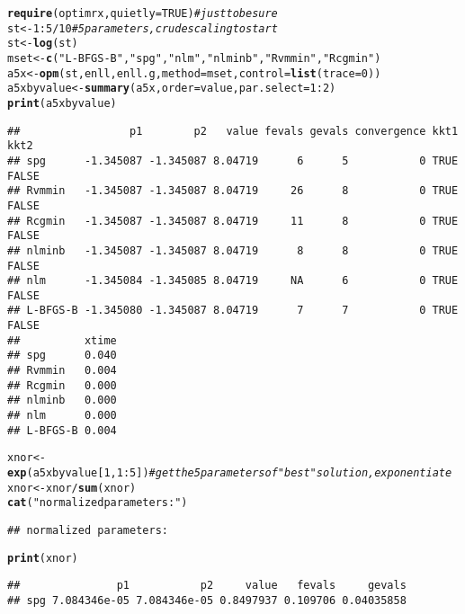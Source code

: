 \documentclass[11pt]{article}\usepackage[]{graphicx}\usepackage[]{color}
\makeatletter
\newcommand{\hlnum}[1]{\textcolor[rgb]{0.686,0.059,0.569}{#1}}%
\newcommand{\hlstr}[1]{\textcolor[rgb]{0.192,0.494,0.8}{#1}}%
\newcommand{\hlcom}[1]{\textcolor[rgb]{0.678,0.584,0.686}{\textit{#1}}}%
\newcommand{\hlopt}[1]{\textcolor[rgb]{0,0,0}{#1}}%
\newcommand{\hlstd}[1]{\textcolor[rgb]{0.345,0.345,0.345}{#1}}%
\newcommand{\hlkwb}[1]{\textcolor[rgb]{0.69,0.353,0.396}{#1}}%
\newcommand{\hlkwc}[1]{\textcolor[rgb]{0.333,0.667,0.333}{#1}}%
\newcommand{\hlkwd}[1]{\textcolor[rgb]{0.737,0.353,0.396}{\textbf{#1}}}%
\newenvironment{kframe}{%
 \def\at@end@of@kframe{}%
 \ifinner\ifhmode%
  \def\at@end@of@kframe{\end{minipage}}%
  \begin{minipage}{\columnwidth}%
 \fi\fi%
 \def\FrameCommand##1{\hskip\@totalleftmargin \hskip-\fboxsep
 \colorbox{shadecolor}{##1}\hskip-\fboxsep
     \hskip-\linewidth \hskip-\@totalleftmargin \hskip\columnwidth}%
 \MakeFramed {\advance\hsize-\width
   \@totalleftmargin\z@ \linewidth\hsize
   \@setminipage}}%
 {\par\unskip\endMakeFramed%
 \at@end@of@kframe}
\newenvironment{knitrout}{}{} %
\makeatother
\begin{document}
\begin{knitrout}\scriptsize
{}\color{fgcolor}\begin{kframe}
\begin{alltt}
\hlkwd{require}\hlstd{(optimrx,} \hlkwc{quietly}\hlstd{=}\hlnum{TRUE}\hlstd{)} \hlcom{# just to be sure}
\hlstd{st}\hlkwb{<-}\hlnum{1}\hlopt{:}\hlnum{5}\hlopt{/}\hlnum{10} \hlcom{# 5 parameters, crude scaling to start}
\hlstd{st}\hlkwb{<-}\hlkwd{log}\hlstd{(st)}
\hlstd{mset}\hlkwb{<-}\hlkwd{c}\hlstd{(}\hlstr{"L-BFGS-B"}\hlstd{,} \hlstr{"spg"}\hlstd{,} \hlstr{"nlm"}\hlstd{,} \hlstr{"nlminb"}\hlstd{,} \hlstr{"Rvmmin"}\hlstd{,} \hlstr{"Rcgmin"}\hlstd{)}
\hlstd{a5x}\hlkwb{<-}\hlkwd{opm}\hlstd{(st, enll, enll.g,} \hlkwc{method}\hlstd{=mset,} \hlkwc{control}\hlstd{=}\hlkwd{list}\hlstd{(}\hlkwc{trace}\hlstd{=}\hlnum{0}\hlstd{))}
\hlstd{a5xbyvalue}\hlkwb{<-}\hlkwd{summary}\hlstd{(a5x,} \hlkwc{order}\hlstd{=value,} \hlkwc{par.select}\hlstd{=}\hlnum{1}\hlopt{:}\hlnum{2}\hlstd{)}
\hlkwd{print}\hlstd{(a5xbyvalue)}
\end{alltt}
\begin{verbatim}
##                 p1        p2   value fevals gevals convergence kkt1  kkt2
## spg      -1.345087 -1.345087 8.04719      6      5           0 TRUE FALSE
## Rvmmin   -1.345087 -1.345087 8.04719     26      8           0 TRUE FALSE
## Rcgmin   -1.345087 -1.345087 8.04719     11      8           0 TRUE FALSE
## nlminb   -1.345087 -1.345087 8.04719      8      8           0 TRUE FALSE
## nlm      -1.345084 -1.345085 8.04719     NA      6           0 TRUE FALSE
## L-BFGS-B -1.345080 -1.345087 8.04719      7      7           0 TRUE FALSE
##          xtime
## spg      0.040
## Rvmmin   0.004
## Rcgmin   0.000
## nlminb   0.000
## nlm      0.000
## L-BFGS-B 0.004
\end{verbatim}
\begin{alltt}
\hlstd{xnor}\hlkwb{<-}\hlkwd{exp}\hlstd{(a5xbyvalue[}\hlnum{1}\hlstd{,} \hlnum{1}\hlopt{:}\hlnum{5}\hlstd{])} \hlcom{# get the 5 parameters of "best" solution, exponentiate}
\hlstd{xnor}\hlkwb{<-}\hlstd{xnor}\hlopt{/}\hlkwd{sum}\hlstd{(xnor)}
\hlkwd{cat}\hlstd{(}\hlstr{"normalized parameters:"}\hlstd{)}
\end{alltt}
\begin{verbatim}
## normalized parameters:
\end{verbatim}
\begin{alltt}
\hlkwd{print}\hlstd{(xnor)}
\end{alltt}
\begin{verbatim}
##               p1           p2     value   fevals     gevals
## spg 7.084346e-05 7.084346e-05 0.8497937 0.109706 0.04035858
\end{verbatim}
\end{kframe}
\end{knitrout}
\end{document}
